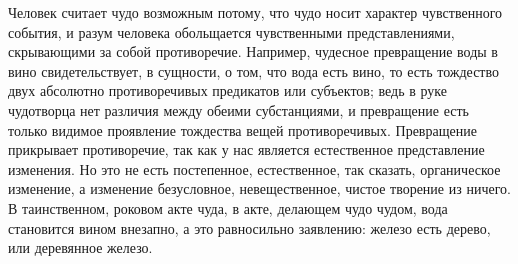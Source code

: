 \documentclass[12pt,oneside]{book}
\begin{document}
Человек считает чудо возможным потому, что чудо носит характер чувственного события, и разум человека обольщается чувственными представлениями, скрывающими за собой противоречие. Например, чудесное превращение воды в вино свидетельствует, в сущности, о том, что вода есть вино, то есть тождество двух абсолютно противоречивых предикатов или субъектов; ведь в руке чудотворца нет различия между обеими субстанциями, и превращение есть только видимое проявление тождества вещей противоречивых. Превращение прикрывает противоречие, так как у нас является естественное представление изменения. Но это не есть постепенное, естественное, так сказать, органическое изменение, а изменение безусловное, невещественное, чистое творение из ничего. В таинственном, роковом акте чуда, в акте, делающем чудо чудом, вода становится вином внезапно, а это равносильно заявлению: железо есть дерево, или деревянное железо.
\end{document}
